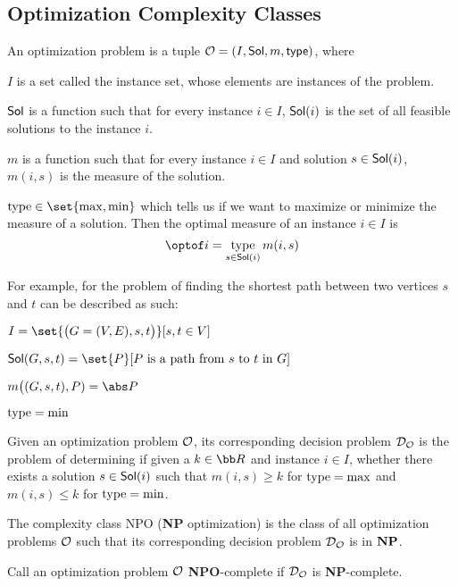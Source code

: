 \subsection{Optimization Complexity Classes}

\bdefn

    An {\emphcolor optimization problem} is a tuple ${\cal O}=(I,{\sf Sol},m,{\sf type})$, where
    \benum
        \item $I$ is a set called the {\emphcolor instance set}, whose elements are instances of the problem.
        \item ${\sf Sol}$ is a function such that for every instance $i\in I$, ${\sf Sol}(i)$ is the set of all feasible solutions to the instance $i$.
        \item $m$ is a function such that for every instance $i\in I$ and solution $s\in{\sf Sol}(i)$, $m(i,s)$ is the {\emphcolor measure} of the solution.
        \item ${\rm type}\in\set{\max,\min}$ which tells us if we want to maximize or minimize the measure of a solution.
    \eenum
    Then the {\emphcolor optimal measure} of an instance $i\in I$ is
    $$ \optof i = \mathop{\rm type}_{s\in{\sf Sol}(i)}m(i,s) $$

\edefn

For example, for the problem of finding the shortest path between two vertices $s$ and $t$ can be described as such:
\blist
    \item $I=\set{\bigl(G=(V,E),s,t\bigr)}[s,t\in V]$
    \item ${\sf Sol}(G,s,t) = \set{P}[\hbox{$P$ is a path from $s$ to $t$ in $G$}]$
    \item $m\bigl((G,s,t),P)=\abs P$
    \item ${\rm type}=\min$
\elist

Given an optimization problem ${\cal O}$, its corresponding decision problem ${\cal D}_{{\cal O}}$ is the problem of determining if given a $k\in{\bb R}$ and instance $i\in I$, whether there exists a solution
$s\in{\sf Sol}(i)$ such that $m(i,s)\geq k$ for ${\rm type}=\max$ and $m(i,s)\leq k$ for ${\rm type}=\min$.

\bdefn

    The complexity class {\emphcolor NPO} ({\bf NP} optimization) is the class of all optimization problems ${\cal O}$ such that its corresponding decision problem ${\cal D}_{{\cal O}}$ is in ${\bf NP}$.

\edefn

Call an optimization problem ${\cal O}$ {\bf NPO}-complete if ${\cal D}_{{\cal O}}$ is {\bf NP}-complete.

